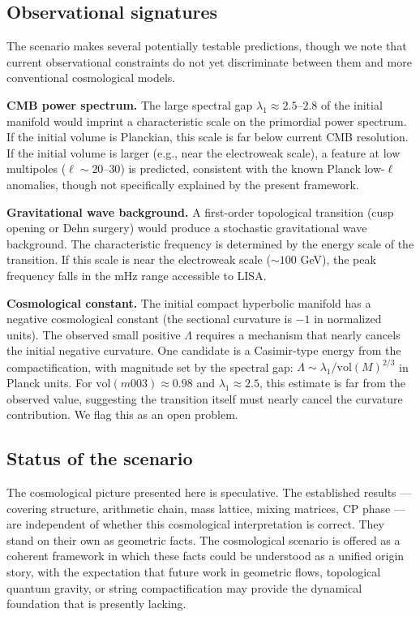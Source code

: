﻿\documentclass[12pt]{article}
\theoremstyle{definition}
\begin{document}
\subsection{Observational signatures}

The scenario makes several potentially testable predictions,
though we note that current observational constraints do not yet
discriminate between them and more conventional cosmological models.

\textbf{CMB power spectrum.} The large spectral gap
$\lambda_1 \approx 2.5$--$2.8$ of the initial manifold would
imprint a characteristic scale on the primordial power spectrum.
If the initial volume is Planckian, this scale is far below current
CMB resolution. If the initial volume is larger (e.g., near the
electroweak scale), a feature at low multipoles ($\ell \sim 20$--$30$)
is predicted, consistent with the known Planck low-$\ell$ anomalies,
though not specifically explained by the present framework.

\textbf{Gravitational wave background.} A first-order topological
transition (cusp opening or Dehn surgery) would produce a stochastic
gravitational wave background. The characteristic frequency is
determined by the energy scale of the transition. If this scale is
near the electroweak scale ($\sim 100$ GeV), the peak frequency
falls in the mHz range accessible to LISA.

\textbf{Cosmological constant.} The initial compact hyperbolic
manifold has a negative cosmological constant (the sectional curvature
is $-1$ in normalized units). The observed small positive $\Lambda$
requires a mechanism that nearly cancels the initial negative
curvature. One candidate is a Casimir-type energy from the
compactification, with magnitude set by the spectral gap:
$\Lambda \sim \lambda_1 / \mathrm{vol}(M)^{2/3}$ in Planck units.
For $\mathrm{vol}(m003) \approx 0.98$ and $\lambda_1 \approx 2.5$,
this estimate is far from the observed value, suggesting the
transition itself must nearly cancel the curvature contribution.
We flag this as an open problem.

\subsection{Status of the scenario}

The cosmological picture presented here is speculative. The
established results --- covering structure, arithmetic chain, mass
lattice, mixing matrices, CP phase --- are independent of whether
this cosmological interpretation is correct. They stand on their own
as geometric facts. The cosmological scenario is offered as a
coherent framework in which these facts could be understood as a
unified origin story, with the expectation that future work in
geometric flows, topological quantum gravity, or string
compactification may provide the dynamical foundation that is
presently lacking.
\end{document}

